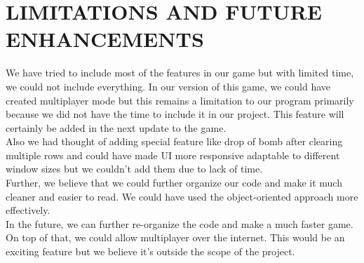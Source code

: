 \newpage
\section{LIMITATIONS AND FUTURE ENHANCEMENTS}

\hspace{5mm} We have tried to include most of the features in our game but with limited time, we could not include everything. In our version of this game, we could have created multiplayer mode but this remains a limitation to our program primarily because we did not have the time to include it in our project. This feature will certainly be added in the next update to the game.\\

Also we had thought of adding special feature like drop of bomb after clearing multiple rows and could have made UI more responsive adaptable to different window sizes but we couldn't add them due to lack of time.\\


 Further, we believe that we could further organize our code and make it much cleaner and easier to read. We could have used the object-oriented approach more effectively.\\
 
  In the future, we can further re-organize the code and make a much faster game. On top of that, we could allow multiplayer over the internet. This would be an exciting feature but we believe it’s outside the scope of the project.